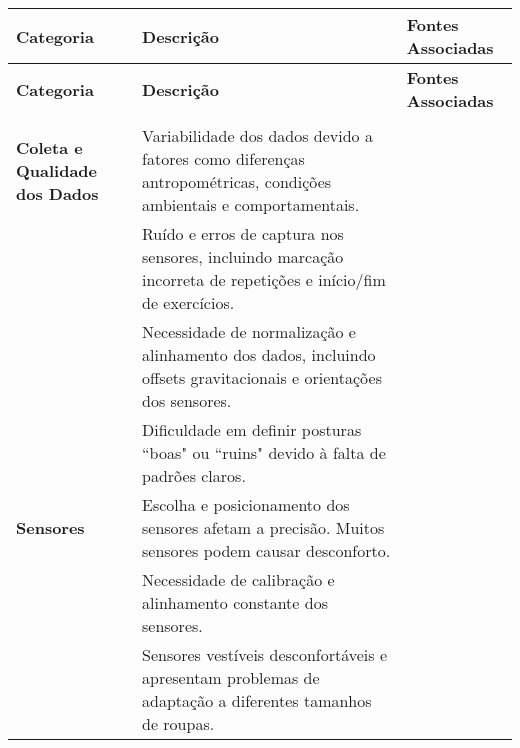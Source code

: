\documentclass[a4paper,12pt]{article}
\begin{document}
\renewcommand{\arraystretch}{1.5}
\setlength{\tabcolsep}{5pt}

\begin{longtable}{|p{3cm}|p{6cm}|p{3.4cm}|}
\hline
\textbf{Categoria} & \textbf{Descrição} & \textbf{Fontes Associadas} \\ \hline
\endfirsthead

\hline
\textbf{Categoria} & \textbf{Descrição} & \textbf{Fontes Associadas} \\ \hline
\endhead

\hline
\endfoot

\multicolumn{3}{l}{}\\
\endlastfoot

\textbf{Coleta e Qualidade dos Dados} & Variabilidade dos dados devido a fatores como diferenças antropométricas, condições ambientais e comportamentais. &  \cite{colpitts2023kinematics, papadopoulou2023towards, Gleadhill2019, Kwon2021, Qi2020, colpitts2023kinematics, Ponton2023, Krauter2024} \\ \cline{2-3}
& Ruído e erros de captura nos sensores, incluindo marcação incorreta de repetições e início/fim de exercícios. & \cite{ Johnson2021, Tian2021, colpitts2023kinematics, Zhang2020, Gleadhill2019, Zou2020, Ceccarelli2024, Michaud2021} \\ \cline{2-3}
& Necessidade de normalização e alinhamento dos dados, incluindo offsets gravitacionais e orientações dos sensores. & \cite{Johnson2021, MallolRagolta2021, Moller2012, Simon2023, Michaud2021, Gleadhill2019} \\ \cline{2-3}
& Dificuldade em definir posturas ``boas" ou ``ruins" devido à falta de padrões claros. & \cite{Krauter2024, papadopoulou2023towards, Gleadhill2019} \\ \hline

\textbf{Sensores} & Escolha e posicionamento dos sensores afetam a precisão. Muitos sensores podem causar desconforto. & \cite{Johnson2021, Krauter2024, Tian2021, papadopoulou2023towards, Gleadhill2019} \\ \cline{2-3}
& Necessidade de calibração e alinhamento constante dos sensores. & \cite{Johnson2021, Ponton2023, Zhang2020, Krauter2024, Gleadhill2019, colpitts2023kinematics} \\ \cline{2-3}
& Sensores vestíveis desconfortáveis e apresentam problemas de adaptação a diferentes tamanhos de roupas. & \cite{Krauter2024, Qi2020, Tian2021, Johnson2021} \\ \hline


\end{longtable}
\end{document}
